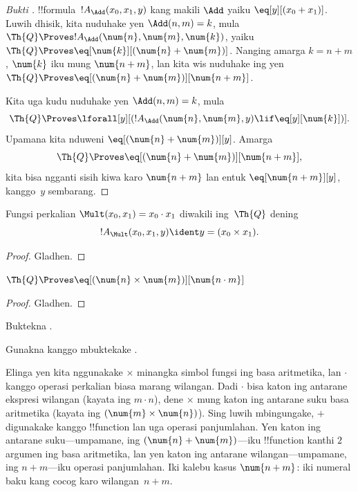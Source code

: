 \documentclass[../../../include/open-logic-section]{subfiles}
\begin{document}
\begin{proof}[Bukti ]
!!{formula}~$!A_\Add(x_0, x_1, y)$ kang makili $\Add$ yaiku
$\eq[y][(x_0 + x_1)]$. Luwih dhisik, kita nuduhake yen $\Add(n, m) = k$, mula
$\Th{Q} \Proves !A_\Add(\num{n}, \num{m}, \num{k})$, yaiku $\Th{Q}
\Proves \eq[\num{k}][(\num{n} + \num{m})]$. Nanging amarga $k = n + m$,
$\num{k}$ iku mung $\num{n+m}$, lan kita wis nuduhake ing
 yen $\Th{Q} \Proves \eq[(\num{n} +
  \num{m})][\num{n+m}]$.

Kita uga kudu nuduhake yen $\Add(n, m) = k$, mula
\[
\Th{Q} \Proves \lforall[y][(!A_\Add(\num{n}, \num{m}, y) \lif
  \eq[y][\num{k}])].
\]
Upamana kita nduweni $\eq[(\num{n} + \num{m})][y]$. Amarga
\[
\Th{Q} \Proves \eq[(\num{n}+\num{m})][\num{n+m}],
\]
kita bisa ngganti sisih kiwa karo $\num{n+m}$ lan entuk
$\eq[\num{n+m}][y]$, kanggo~$y$ sembarang.
\end{proof}

\begin{prop}
Fungsi perkalian $\Mult(x_0, x_1) = x_0 \cdot x_1$ diwakili
ing~$\Th{Q}$ dening
\[
  !A_{\Mult}(x_0, x_1, y) \ident y = (x_0 \times x_1).
\]
\end{prop}

\begin{proof} Gladhen. \end{proof}

\begin{lem}
$\Th{Q} \Proves \eq[(\num{n} \times \num{m})][\num{n \cdot m}]$
\end{lem}

\begin{proof} Gladhen. \end{proof}

\begin{prob}
Buktekna .
\end{prob}

\begin{prob}
Gunakna  kanggo mbuktekake
.
\end{prob}

\begin{explain}
  Elinga yen kita nggunakake $\times$ minangka simbol fungsi ing basa
  aritmetika, lan $\cdot$ kanggo operasi perkalian biasa marang
  wilangan. Dadi $\cdot$ bisa katon ing antarane ekspresi wilangan
  (kayata ing $m \cdot n$), dene $\times$ mung katon ing antarane suku
  basa aritmetika (kayata ing $(\num{m} \times
  \num{n})$). Sing luwih mbingungake, $+$ digunakake kanggo
  !!{function} lan uga operasi panjumlahan. Yen katon ing antarane
  suku---umpamane, ing $(\num{n} + \num{m})$---iku !!{function} kanthi
  $2$ argumen ing basa aritmetika, lan yen katon ing antarane
  wilangan---umpamane, ing $n+m$---iku operasi panjumlahan.
  Iki kalebu kasus $\num{n+m}$: iki numeral baku
  kang cocog karo wilangan~$n+m$.
\end{explain}
\end{document}
